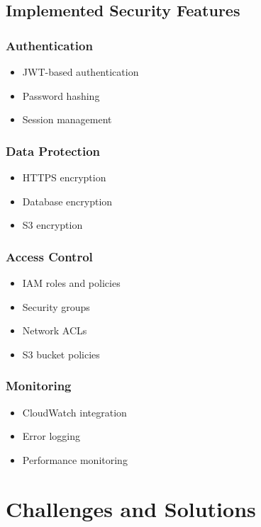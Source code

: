 \documentclass[12pt,a4paper]{article}
\begin{document}
\subsection{Implemented Security Features}

\subsubsection{Authentication}
\begin{itemize}
    \item JWT-based authentication
    \item Password hashing
    \item Session management
\end{itemize}

\subsubsection{Data Protection}
\begin{itemize}
    \item HTTPS encryption
    \item Database encryption
    \item S3 encryption
\end{itemize}

\subsubsection{Access Control}
\begin{itemize}
    \item IAM roles and policies
    \item Security groups
    \item Network ACLs
    \item S3 bucket policies
\end{itemize}

\subsubsection{Monitoring}
\begin{itemize}
    \item CloudWatch integration
    \item Error logging
    \item Performance monitoring
\end{itemize}

\section{Challenges and Solutions}
\end{document}

